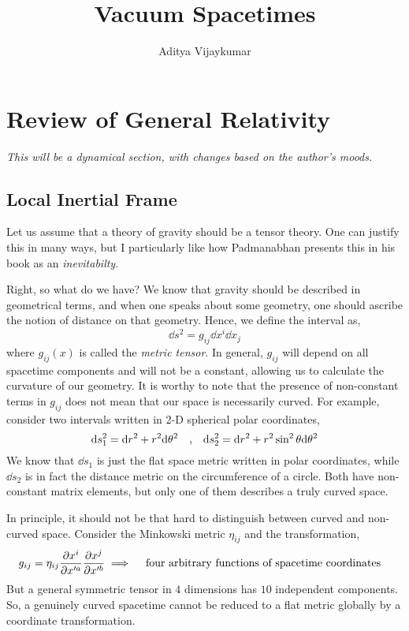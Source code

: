 \documentclass[a4paper,11pt]{article}
\title{\textbf{Vacuum Spacetimes}}
\author{Aditya Vijaykumar}
\affiliation{International Centre for Theoretical Sciences, Bengaluru, India.}
\begin{document}
\maketitle

\section{Review of General Relativity}
\textit{This will be a dynamical section, with changes based on the author's moods.}
\subsection{Local Inertial Frame}
Let us assume that a theory of gravity should be a tensor theory. One can justify this in many ways, but I particularly like how Padmanabhan presents this in his book as an \textit{inevitabilty}.

Right, so what do we have? We know that gravity should be described in geometrical terms, and when one speaks about some geometry, one should ascribe the notion of distance on that geometry. Hence, we define the interval as,
\begin{equation}
\dd s^2 = g_{ij} \dd x^i \dd x_j
\end{equation}
where  $ g_{ij}(x) $ is called the \textit{metric tensor}. In general, $ g_{ij} $ will depend on all spacetime components and will not be a constant, allowing us to calculate the curvature of our geometry. It is worthy to note that the presence of non-constant terms in $ g_{ij} $ does not mean that our space is necessarily curved. For example, consider two intervals written in 2-D spherical polar coordinates,
\begin{equation*}
\dd s_1^2 = \dd r^2 + r^2 \dd \theta^2 \qq{,} \dd s_2^2 = \dd r^2 + r^2 \sin^2 \theta \dd \theta^2
\end{equation*}
We know that $ \dd s_1 $ is just the flat space metric written in polar coordinates, while $ \dd s_2 $ is in fact the distance metric on the circumference of a circle. Both have non-constant matrix elements, but only one of them describes a truly curved space.

In principle, it should not be that hard to distinguish between curved and non-curved space. Consider the Minkowski metric $ \eta_{ij} $ and the transformation,
\begin{equation}\label{key}
g_{ij} = \eta_{ij} \pdv{x^i}{x'^a} \pdv{x^j}{x'^b} \implies \qq{four arbitrary functions of spacetime coordinates}
\end{equation}
But a general symmetric tensor in $ 4 $ dimensions has $ 10 $ independent components. So, a genuinely curved spacetime cannot be reduced to a flat metric globally by a coordinate transformation.
\end{document}
